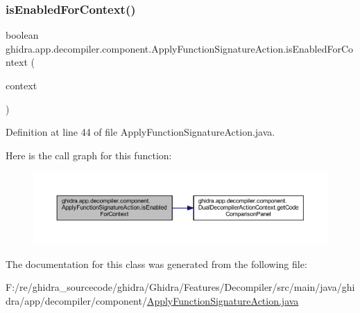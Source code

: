 \subsubsection{\texorpdfstring{isEnabledForContext()}{isEnabledForContext()}}
{\footnotesize\ttfamily boolean ghidra.\+app.\+decompiler.\+component.\+Apply\+Function\+Signature\+Action.\+is\+Enabled\+For\+Context (\begin{DoxyParamCaption}\item[{Action\+Context}]{context }\end{DoxyParamCaption})\hspace{0.3cm}{\ttfamily [inline]}}



Definition at line 44 of file Apply\+Function\+Signature\+Action.\+java.

Here is the call graph for this function\+:
\nopagebreak
\begin{figure}[H]
\begin{center}
\leavevmode
\includegraphics[width=350pt]{classghidra_1_1app_1_1decompiler_1_1component_1_1_apply_function_signature_action_ac0deeaae0f5d80371c729dd0192fbee1_cgraph}
\end{center}
\end{figure}


The documentation for this class was generated from the following file\+:\begin{DoxyCompactItemize}
\item 
F\+:/re/ghidra\+\_\+sourcecode/ghidra/\+Ghidra/\+Features/\+Decompiler/src/main/java/ghidra/app/decompiler/component/\mbox{\hyperlink{_apply_function_signature_action_8java}{Apply\+Function\+Signature\+Action.\+java}}\end{DoxyCompactItemize}
